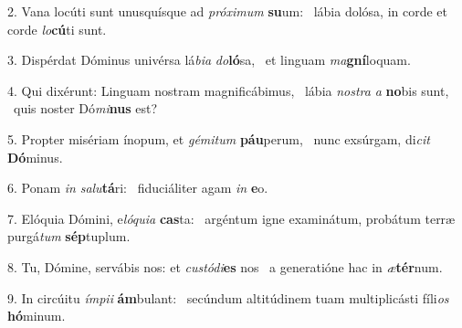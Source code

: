 2. Vana locúti sunt unusquísque ad \textit{pró}\textit{xi}\textit{mum} \textbf{su}um: \ast\  lábia dolósa, in corde et corde \textit{lo}\textbf{cú}ti sunt.\

3. Dispérdat Dóminus univérsa lá\textit{bi}\textit{a} \textit{do}\textbf{ló}sa, \ast\  et linguam \textit{ma}\textbf{gní}loquam.\

4. Qui dixérunt: Linguam nostram magnificábimus, \dag\  lábia \textit{nos}\textit{tra} \textit{a} \textbf{no}bis sunt, \ast\  quis noster Dó\textit{mi}\textbf{nus} est?\

5. Propter misériam ínopum, et \textit{gé}\textit{mi}\textit{tum} \textbf{páu}perum, \ast\  nunc exsúrgam, di\textit{cit} \textbf{Dó}minus.\

6. Ponam \textit{in} \textit{sa}\textit{lu}\textbf{tá}ri: \ast\  fiduciáliter agam \textit{in} \textbf{e}o.\

7. Elóquia Dómini, e\textit{ló}\textit{qui}\textit{a} \textbf{cas}ta: \ast\  argéntum igne examinátum, probátum terræ purgá\textit{tum} \textbf{sép}tuplum.\

8. Tu, Dómine, servábis nos: et \textit{cus}\textit{tó}\textit{di}\textbf{es} nos \ast\  a generatióne hac in \textit{æ}\textbf{tér}num.\

9. In circúitu \textit{ím}\textit{pi}\textit{i} \textbf{ám}bulant: \ast\  secúndum altitúdinem tuam multiplicásti fíli\textit{os} \textbf{hó}minum.\

